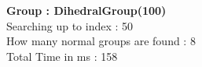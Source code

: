 \textbf{Group : DihedralGroup(100)}\\
Searching up to index : 50\\
How many normal groups are found : 8\\
Total Time in ms : 158\\
